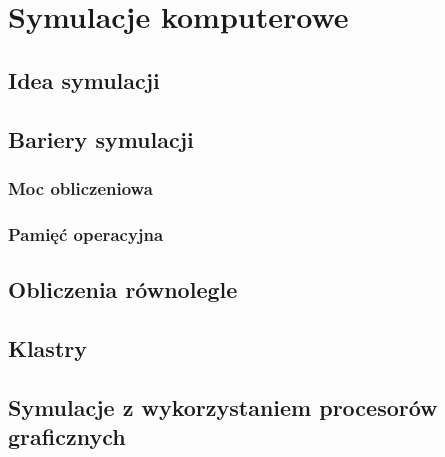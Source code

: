 \chapter{Symulacje komputerowe}

	\section{Idea symulacji}
	\section{Bariery symulacji}
		\subsection{Moc obliczeniowa}
		\subsection{Pamięć operacyjna}
	\section{Obliczenia równolegle}
	\section{Klastry}
	\section{Symulacje z wykorzystaniem procesorów graficznych}
